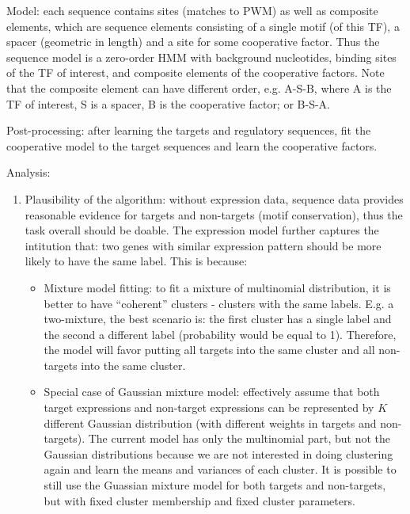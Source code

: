 \documentclass[11pt]{article}
\begin{document}
\begin{enumerate}
\begin{enumerate}
Model: each sequence contains sites (matches to PWM) as well as composite elements, which are sequence elements consisting of a single motif (of this TF), a spacer (geometric in length) and a site for some cooperative factor. Thus the sequence model is a zero-order HMM with background nucleotides, binding sites of the TF of interest, and composite elements of the cooperative factors. Note that the composite element can have different order, e.g. A-S-B, where A is the TF of interest, S is a spacer, B is the cooperative factor; or B-S-A. 

Post-processing: after learning the targets and regulatory sequences, fit the cooperative model to the target sequences and learn the cooperative factors. 

\end{enumerate}

Analysis: 

\begin{enumerate}

\item Plausibility of the algorithm: without expression data, sequence data provides reasonable evidence for targets and non-targets (motif conservation), thus the task overall should be doable. The expression model further captures the intitution that: two genes with similar expression pattern should be more likely to have the same label. This is because: 
\begin{itemize}
\item Mixture model fitting: to fit a mixture of multinomial distribution, it is better to have ``coherent'' clusters - clusters with the same labels. E.g. a two-mixture, the best scenario is: the first cluster has a single label and the second a different label (probability would be equal to 1). Therefore, the model will favor putting all targets into the same cluster and all non-targets into the same cluster. 

\item Special case of Gaussian mixture model: effectively assume that both target expressions and non-target expressions can be represented by $K$ different Gaussian distribution (with different weights in targets and non-targets). The current model has only the multinomial part, but not the Gaussian distributions because we are not interested in doing clustering again and learn the means and variances of each cluster. It is possible to still use the Guassian mixture model for both targets and non-targets, but with fixed cluster membership and fixed cluster parameters. 
\end{itemize}


\end{enumerate}
\end{enumerate}
\end{document}
